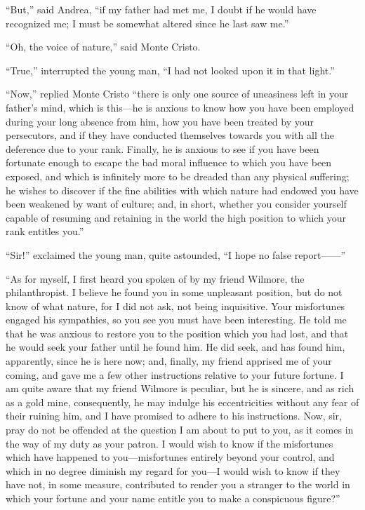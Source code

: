“But,” said Andrea, “if my father had met me, I doubt if he would have
recognized me; I must be somewhat altered since he last saw me.”

“Oh, the voice of nature,” said Monte Cristo.

“True,” interrupted the young man, “I had not looked upon it in that
light.”

“Now,” replied Monte Cristo “there is only one source of uneasiness
left in your father’s mind, which is this—he is anxious to know how you
have been employed during your long absence from him, how you have been
treated by your persecutors, and if they have conducted themselves
towards you with all the deference due to your rank. Finally, he is
anxious to see if you have been fortunate enough to escape the bad
moral influence to which you have been exposed, and which is infinitely
more to be dreaded than any physical suffering; he wishes to discover
if the fine abilities with which nature had endowed you have been
weakened by want of culture; and, in short, whether you consider
yourself capable of resuming and retaining in the world the high
position to which your rank entitles you.”

“Sir!” exclaimed the young man, quite astounded, “I hope no false
report——”

“As for myself, I first heard you spoken of by my friend Wilmore, the
philanthropist. I believe he found you in some unpleasant position, but
do not know of what nature, for I did not ask, not being inquisitive.
Your misfortunes engaged his sympathies, so you see you must have been
interesting. He told me that he was anxious to restore you to the
position which you had lost, and that he would seek your father until
he found him. He did seek, and has found him, apparently, since he is
here now; and, finally, my friend apprised me of your coming, and gave
me a few other instructions relative to your future fortune. I am quite
aware that my friend Wilmore is peculiar, but he is sincere, and as
rich as a gold mine, consequently, he may indulge his eccentricities
without any fear of their ruining him, and I have promised to adhere to
his instructions. Now, sir, pray do not be offended at the question I
am about to put to you, as it comes in the way of my duty as your
patron. I would wish to know if the misfortunes which have happened to
you—misfortunes entirely beyond your control, and which in no degree
diminish my regard for you—I would wish to know if they have not, in
some measure, contributed to render you a stranger to the world in
which your fortune and your name entitle you to make a conspicuous
figure?”

